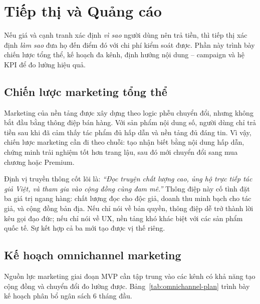\section{Tiếp thị và Quảng cáo}

Nếu giá và cạnh tranh xác định \textit{vì sao} người dùng nên trả tiền, thì tiếp thị xác định \textit{làm sao} đưa họ đến điểm đó với chi phí kiểm soát được. Phần này trình bày chiến lược tổng thể, kế hoạch đa kênh, định hướng nội dung -- campaign và hệ KPI để đo lường hiệu quả.

\subsection{Chiến lược marketing tổng thể}

Marketing của nền tảng được xây dựng theo logic phễu chuyển đổi, nhưng không bắt đầu bằng thông điệp bán hàng. Với sản phẩm nội dung số, người dùng chỉ trả tiền sau khi đã cảm thấy tác phẩm đủ hấp dẫn và nền tảng đủ đáng tin. Vì vậy, chiến lược marketing cần đi theo chuỗi: tạo nhận biết bằng nội dung hấp dẫn, chứng minh trải nghiệm tốt hơn trang lậu, sau đó mới chuyển đổi sang mua chương hoặc Premium.

Định vị truyền thông cốt lõi là: \textit{``Đọc truyện chất lượng cao, ủng hộ trực tiếp tác giả Việt, và tham gia vào cộng đồng cùng đam mê.''} Thông điệp này cố tình đặt ba giá trị ngang hàng: chất lượng đọc cho độc giả, doanh thu minh bạch cho tác giả, và cộng đồng bản địa. Nếu chỉ nói về bản quyền, thông điệp dễ trở thành lời kêu gọi đạo đức; nếu chỉ nói về UX, nền tảng khó khác biệt với các sản phẩm quốc tế. Sự kết hợp cả ba mới tạo được vị thế riêng.

\subsection{Kế hoạch omnichannel marketing}

Nguồn lực marketing giai đoạn MVP cần tập trung vào các kênh có khả năng tạo cộng đồng và chuyển đổi đo lường được. Bảng~\ref{tab:omnichannel-plan} trình bày kế hoạch phân bổ ngân sách 6 tháng đầu.

